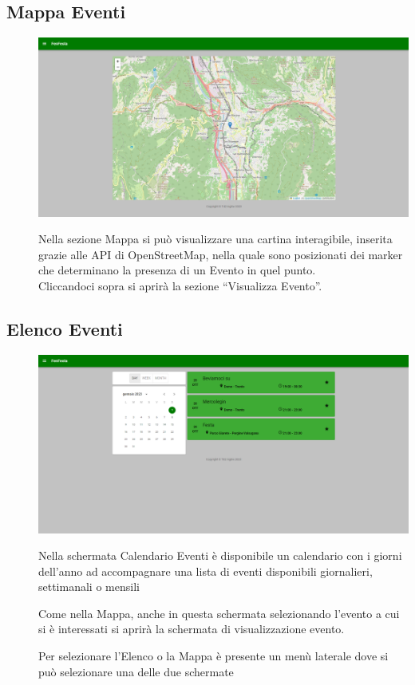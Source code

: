 \documentclass{article}
\begin{document}
\subsection{Mappa Eventi}
\begin{description}
    \item[] \begin{center}
            \includegraphics[scale=0.3]{Mappa_Eventi.png}
        \end{center}
    \item[] Nella sezione Mappa si può visualizzare una cartina interagibile, inserita grazie alle API di OpenStreetMap, nella quale sono posizionati dei marker che determinano la presenza di un Evento in quel punto. \\ Cliccandoci sopra si aprirà la sezione “Visualizza Evento”.
\end{description}
\subsection{Elenco Eventi}
\begin{description}
    \item[] \begin{center}
            \includegraphics[scale=0.3]{Elenco_Eventi.png}
        \end{center}
    \item[] Nella schermata Calendario Eventi è disponibile un calendario con i giorni dell'anno ad accompagnare una lista di eventi disponibili giornalieri, settimanali o mensili
    \item[] Come nella Mappa, anche in questa schermata selezionando l'evento a cui si è interessati si aprirà la schermata di visualizzazione evento.
    \item[] Per selezionare l'Elenco o la Mappa è presente un menù laterale dove si può selezionare una delle due schermate
\end{description}
\clearpage
\end{document}
